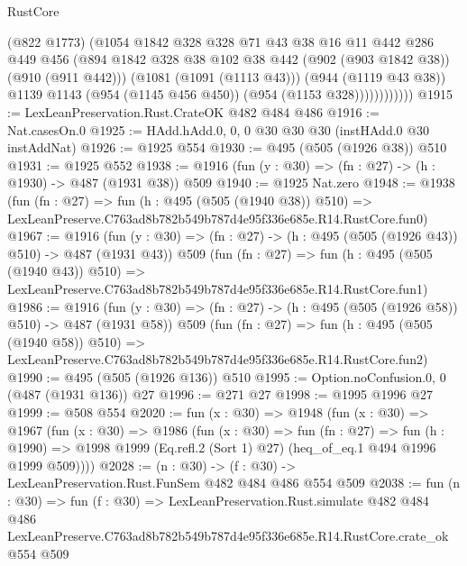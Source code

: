 \begin{lexlean}{RustCore}
\begin{coremodule}
                      (@822 @1773)
                      (@1054
                        @1842
                        @328
                        @328
                        @71
                        @43
                        @38
                        @16
                        @11
                        @442
                        @286
                        @449
                        @456
                        (@894
                          @1842
                          @328
                          @38
                          @102
                          @38
                          @442
                          (@902 (@903 @1842 @38))
                          (@910 (@911 @442)))
                        (@1081 (@1091 (@1113 @43)))
                        (@944 (@1119 @43 @38))
                        @1139
                        @1143
                        (@954 (@1145 @456 @450))
                        (@954 (@1153 @328))))))))))))
@1915 := LexLeanPreservation.Rust.CrateOK @482 @484 @486
@1916 := Nat.casesOn.{0}
@1925 := HAdd.hAdd.{0, 0, 0} @30 @30 @30 (instHAdd.{0} @30 instAddNat)
@1926 := @1925 @554
@1930 := @495 (@505 (@1926 @38)) @510
@1931 := @1925 @552
@1938 := @1916 (fun (y : @30) => (fn : @27) -> (h : @1930) -> @487 (@1931 @38)) @509
@1940 := @1925 Nat.zero
@1948 := @1938
    (fun (fn : @27) =>
    fun (h : @495 (@505 (@1940 @38)) @510) =>
    LexLeanPreserve.C763ad8b782b549b787d4e95f336e685e.R14.RustCore.fun0)
@1967 := @1916
    (fun (y : @30) => (fn : @27) -> (h : @495 (@505 (@1926 @43)) @510) -> @487 (@1931 @43))
    @509
    (fun (fn : @27) =>
    fun (h : @495 (@505 (@1940 @43)) @510) =>
    LexLeanPreserve.C763ad8b782b549b787d4e95f336e685e.R14.RustCore.fun1)
@1986 := @1916
    (fun (y : @30) => (fn : @27) -> (h : @495 (@505 (@1926 @58)) @510) -> @487 (@1931 @58))
    @509
    (fun (fn : @27) =>
    fun (h : @495 (@505 (@1940 @58)) @510) =>
    LexLeanPreserve.C763ad8b782b549b787d4e95f336e685e.R14.RustCore.fun2)
@1990 := @495 (@505 (@1926 @136)) @510
@1995 := Option.noConfusion.{0, 0} (@487 (@1931 @136)) @27
@1996 := @271 @27
@1998 := @1995 @1996 @27
@1999 := @508 @554
@2020 := fun (x : @30) =>
  @1948
    (fun (x : @30) =>
    @1967
      (fun (x : @30) =>
      @1986
        (fun (x : @30) =>
        fun (fn : @27) =>
        fun (h : @1990) =>
        @1998 @1999 (Eq.refl.{2} (Sort 1) @27) (heq_of_eq.{1} @494 @1996 @1999 @509))))
@2028 := (n : @30) -> (f : @30) -> LexLeanPreservation.Rust.FunSem @482 @484 @486 @554 @509
@2038 := fun (n : @30) =>
  fun (f : @30) =>
  LexLeanPreservation.Rust.simulate
    @482
    @484
    @486
    LexLeanPreserve.C763ad8b782b549b787d4e95f336e685e.R14.RustCore.crate_ok
    @554
    @509
\end{coremodule}
\end{lexlean}
